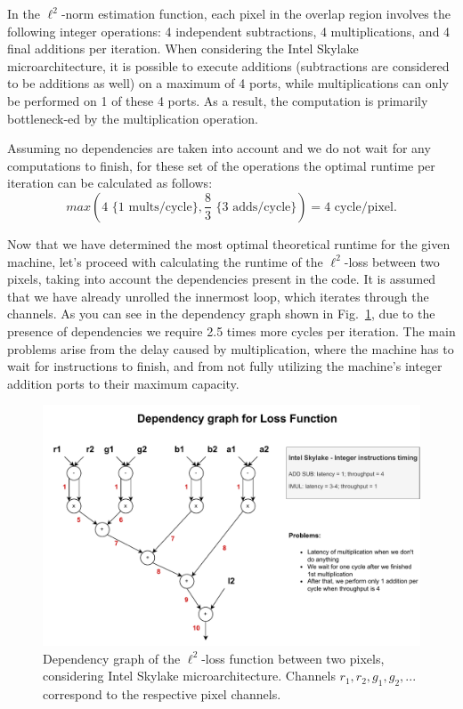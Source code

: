 \documentclass[letterpaper]{article}
\begin{document}
In the $\ell^2$-norm estimation function, each pixel in the overlap region involves the following integer operations: 4 independent subtractions, 4 multiplications, and 4 final additions per iteration. When considering the Intel Skylake microarchitecture, it is possible to execute additions (subtractions are considered to be additions as well) on a maximum of 4 ports, while multiplications can only be performed on 1 of these 4 ports. As a result, the computation is primarily bottleneck-ed by the multiplication operation.

Assuming no dependencies are taken into account and we do not wait for any computations to finish, for these set of the operations the optimal runtime per iteration can be calculated as follows:
\[ max(4 \text{ \{1 mults/cycle\}}, \frac{8}{3} \text{ \{3 adds/cycle\}}) = 4 \text{ cycle/pixel}. \]

Now that we have determined the most optimal theoretical runtime for the given machine, let's proceed with calculating the runtime of the $\ell^2$-loss between two pixels, taking into account the dependencies present in the code. It is assumed that we have already unrolled the innermost loop, which iterates through the channels. As you can see in the dependency graph shown in Fig.~\ref{dg}, due to the presence of dependencies we require 2.5 times more cycles per iteration. The main problems arise from the delay caused by multiplication, where the machine has to wait for instructions to finish, and from not fully utilizing the machine's integer addition ports to their maximum capacity.

\begin{figure}[htb]
\centering
  \includegraphics[scale=0.35]{DependencyGraph.pdf}
  \caption{Dependency graph of the $\ell^2$-loss function between two pixels, considering Intel Skylake microarchitecture. Channels {$r_{1}, r_{2}, g_{1}, g_{2}, ...$} correspond to the respective pixel channels.
  \label{dg}}
\end{figure}
\end{document}
